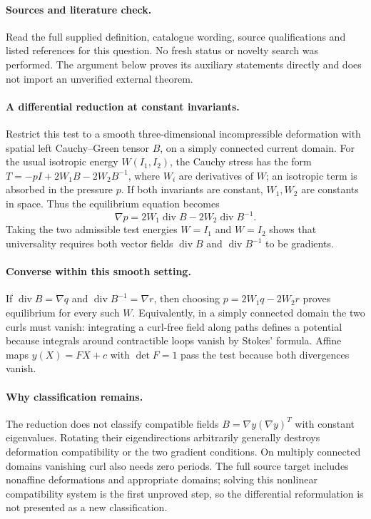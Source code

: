 \documentclass[11pt]{article}
\begin{document}
\paragraph{Sources and literature check.}
Read the full supplied definition, catalogue wording, source qualifications and listed references for this question. No fresh status or novelty search was performed. The argument below proves its auxiliary statements directly and does not import an unverified external theorem.

\paragraph{A differential reduction at constant invariants.} Restrict this test to a smooth three-dimensional incompressible deformation with spatial left Cauchy--Green tensor \(B\), on a simply connected current domain. For the usual isotropic energy \(W(I_1,I_2)\), the Cauchy stress has the form \(T=-pI+2W_1B-2W_2B^{-1}\), where \(W_i\) are derivatives of \(W\); an isotropic term is absorbed in the pressure \(p\). If both invariants are constant, \(W_1,W_2\) are constants in space. Thus the equilibrium equation becomes
\[
 \nabla p=2W_1\operatorname{div}B-2W_2\operatorname{div}B^{-1}.
\]
Taking the two admissible test energies \(W=I_1\) and \(W=I_2\) shows that universality requires both vector fields \(\operatorname{div}B\) and \(\operatorname{div}B^{-1}\) to be gradients.
\paragraph{Converse within this smooth setting.} If \(\operatorname{div}B=\nabla q\) and \(\operatorname{div}B^{-1}=\nabla r\), then choosing \(p=2W_1q-2W_2r\) proves equilibrium for every such \(W\). Equivalently, in a simply connected domain the two curls must vanish: integrating a curl-free field along paths defines a potential because integrals around contractible loops vanish by Stokes' formula. Affine maps \(y(X)=FX+c\) with \(\det F=1\) pass the test because both divergences vanish.
\paragraph{Why classification remains.} The reduction does not classify compatible fields \(B=\nabla y(\nabla y)^T\) with constant eigenvalues. Rotating their eigendirections arbitrarily generally destroys deformation compatibility or the two gradient conditions. On multiply connected domains vanishing curl also needs zero periods. The full source target includes nonaffine deformations and appropriate domains; solving this nonlinear compatibility system is the first unproved step, so the differential reformulation is not presented as a new classification.
\end{document}
